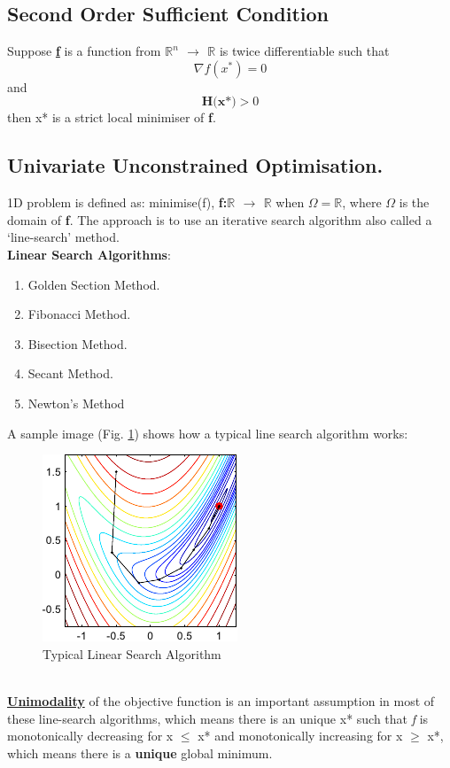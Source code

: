 \documentclass[12pt,a4paper,titlepage]{article}
\begin{document}
\subsection{Second Order Sufficient Condition}
Suppose \textbf{\underline{f}} is a function from \textbf{$\mathbb{R}^n$ $\rightarrow$ $\mathbb{R}$} is twice differentiable such that 
\begin{equation}
    \nabla f(x^{*})=0    
\end{equation}
and
\begin{equation}
    \textbf{H(x*)} > 0
\end{equation}
then x* is a strict local minimiser of \textbf{f}.

\subsection{Univariate Unconstrained Optimisation.}
1D problem is defined as:
minimise(f), \textbf{f:$\mathbb{R}$ $\rightarrow$ $\mathbb{R}$} when $\Omega = \mathbb{R}$, where $\Omega$ is the domain of \textbf{f}.
The approach is to use an iterative search algorithm also called a `line-search' method. \\
\textbf{Linear Search Algorithms}: 
\begin{enumerate}
    \item Golden Section Method.
    \item Fibonacci Method.
    \item Bisection Method.
    \item Secant Method.
    \item Newton's Method
\end{enumerate}

A sample image (Fig. \ref{fig1}) shows how a typical line search algorithm works: 
\begin{figure}[h!tb]
	\centering
	\includegraphics[scale=1]{line_searchdemo.png}
	\caption{Typical Linear Search Algorithm} \label{fig1}
\end{figure}
\\
\textbf{\underline{Unimodality}} of the objective function is an important assumption in most of these line-search algorithms, which means there is an unique x* such that \emph{f} is monotonically decreasing for x $\leq$ x* and monotonically increasing for x $\geq$ x*, which means there is a \textbf{unique} global minimum.
\end{document}
